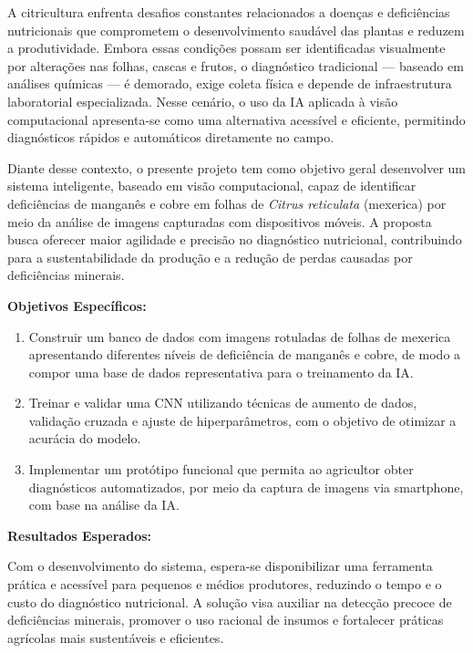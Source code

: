A citricultura enfrenta desafios constantes relacionados a doenças e deficiências nutricionais que comprometem o desenvolvimento saudável das plantas e reduzem a produtividade. Embora essas condições possam ser identificadas visualmente por alterações nas folhas, cascas e frutos, o diagnóstico tradicional — baseado em análises químicas — é demorado, exige coleta física e depende de infraestrutura laboratorial especializada. Nesse cenário, o uso da IA aplicada à visão computacional apresenta-se como uma alternativa acessível e eficiente, permitindo diagnósticos rápidos e automáticos diretamente no campo.

Diante desse contexto, o presente projeto tem como objetivo geral desenvolver um sistema inteligente, baseado em visão computacional, capaz de identificar deficiências de manganês e cobre em folhas de \textit{Citrus reticulata} (mexerica) por meio da análise de imagens capturadas com dispositivos móveis. A proposta busca oferecer maior agilidade e precisão no diagnóstico nutricional, contribuindo para a sustentabilidade da produção e a redução de perdas causadas por deficiências minerais.

\textbf{Objetivos Específicos:}
\begin{enumerate}
\item Construir um banco de dados com imagens rotuladas de folhas de mexerica apresentando diferentes níveis de deficiência de manganês e cobre, de modo a compor uma base de dados representativa para o treinamento da IA.
\item Treinar e validar uma CNN utilizando técnicas de aumento de dados, validação cruzada e ajuste de hiperparâmetros, com o objetivo de otimizar a acurácia do modelo.
\item Implementar um protótipo funcional que permita ao agricultor obter diagnósticos automatizados, por meio da captura de imagens via smartphone, com base na análise da IA.
\end{enumerate}

\textbf{Resultados Esperados:}

Com o desenvolvimento do sistema, espera-se disponibilizar uma ferramenta prática e acessível para pequenos e médios produtores, reduzindo o tempo e o custo do diagnóstico nutricional. A solução visa auxiliar na detecção precoce de deficiências minerais, promover o uso racional de insumos e fortalecer práticas agrícolas mais sustentáveis e eficientes.